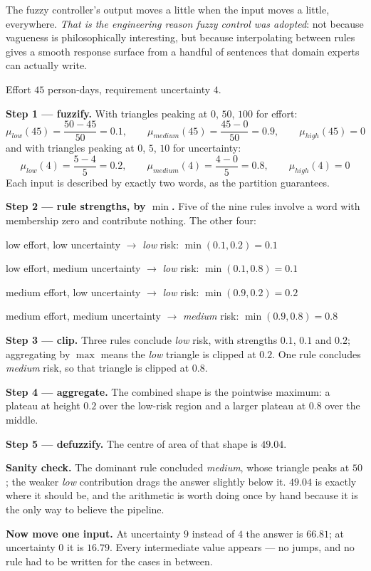 The fuzzy controller's output moves a little when the input moves a little,
everywhere. \emph{That is the engineering reason fuzzy control was adopted}: not
because vagueness is philosophically interesting, but because interpolating between
rules gives a smooth response surface from a handful of sentences that domain
experts can actually write.

\begin{worked}
Effort $45$ person-days, requirement uncertainty $4$.

\smallskip
\textbf{Step 1 --- fuzzify.} With triangles peaking at $0$, $50$, $100$ for effort:
\[
  \mu_{\mathit{low}}(45) = \frac{50-45}{50} = 0.1, \qquad
  \mu_{\mathit{medium}}(45) = \frac{45-0}{50} = 0.9, \qquad
  \mu_{\mathit{high}}(45) = 0
\]
and with triangles peaking at $0$, $5$, $10$ for uncertainty:
\[
  \mu_{\mathit{low}}(4) = \frac{5-4}{5} = 0.2, \qquad
  \mu_{\mathit{medium}}(4) = \frac{4-0}{5} = 0.8, \qquad
  \mu_{\mathit{high}}(4) = 0
\]
Each input is described by exactly two words, as the partition guarantees.

\smallskip
\textbf{Step 2 --- rule strengths, by $\min$.} Five of the nine rules involve a word
with membership zero and contribute nothing. The other four:
\begin{tight}
  \item low effort, low uncertainty $\to$ \emph{low} risk: $\min(0.1, 0.2) = 0.1$
  \item low effort, medium uncertainty $\to$ \emph{low} risk: $\min(0.1, 0.8) = 0.1$
  \item medium effort, low uncertainty $\to$ \emph{low} risk: $\min(0.9, 0.2) = 0.2$
  \item medium effort, medium uncertainty $\to$ \emph{medium} risk:
        $\min(0.9, 0.8) = 0.8$
\end{tight}

\smallskip
\textbf{Step 3 --- clip.} Three rules conclude \emph{low} risk, with strengths
$0.1$, $0.1$ and $0.2$; aggregating by $\max$ means the \emph{low} triangle is
clipped at $0.2$. One rule concludes \emph{medium} risk, so that triangle is clipped
at $0.8$.

\smallskip
\textbf{Step 4 --- aggregate.} The combined shape is the pointwise maximum: a
plateau at height $0.2$ over the low-risk region and a larger plateau at $0.8$ over
the middle.

\smallskip
\textbf{Step 5 --- defuzzify.} The centre of area of that shape is
$\mathbf{49.04}$.

\smallskip
\textbf{Sanity check.} The dominant rule concluded \emph{medium}, whose triangle
peaks at $50$; the weaker \emph{low} contribution drags the answer slightly below
it. $49.04$ is exactly where it should be, and the arithmetic is worth doing once by
hand because it is the only way to believe the pipeline.

\smallskip
\textbf{Now move one input.} At uncertainty $9$ instead of $4$ the answer is
$66.81$; at uncertainty $0$ it is $16.79$. Every intermediate value appears ---
no jumps, and no rule had to be written for the cases in between.
\end{worked}

